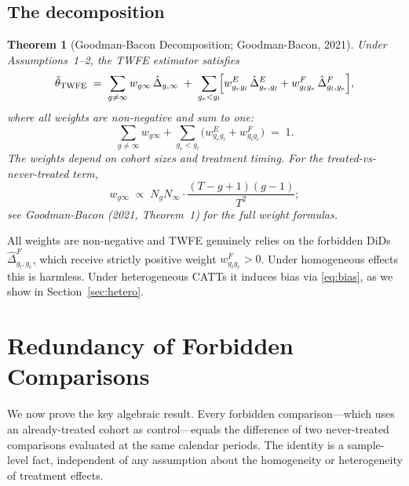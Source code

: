 \documentclass[12pt,letterpaper]{article}
\newtheorem{theorem}{Theorem}[section]
\theoremstyle{remark}
\theoremstyle{definition}
\newcommand{\TWFE}{\hat{\theta}_{\mathrm{TWFE}}}
\newcommand{\hDelta}{\hat{\Delta}}
\begin{document}
\subsection*{The decomposition}

\begin{theorem}[Goodman-Bacon Decomposition; Goodman-Bacon, 2021]
  \label{thm:gb}
  Under Assumptions~1--2, the TWFE estimator satisfies
  \begin{equation}
    \TWFE
    \;=\;
    \sum_{g\neq\infty}w_{g\infty}\,\hDelta_{g,\infty}
    \;+\;
    \sum_{g_e<g_l}\!
      \Bigl[
        w_{g_e g_l}^{E}\,\hDelta_{g_e,g_l}^{E}
        +
        w_{g_l g_e}^{F}\,\hDelta_{g_l,g_e}^{F}
      \Bigr],
    \label{eq:gb}
  \end{equation}
  where all weights are non-negative and sum to one:
  \[
    \sum_{g\neq\infty}w_{g\infty}
    +\sum_{g_e<g_l}\!\bigl(w_{g_e g_l}^{E}+w_{g_l g_e}^{F}\bigr)
    \;=\;1.
  \]
  The weights depend on cohort sizes and treatment timing. For the
  treated-vs-never-treated term,
  \[
    w_{g\infty}
    \;\propto\;
    N_g N_\infty \cdot
    \frac{(T-g+1)(g-1)}{T^2};
  \]
  see Goodman-Bacon (2021, Theorem~1) for the full weight formulas.
\end{theorem}

\noindent
All weights are non-negative and TWFE genuinely relies on the forbidden DiDs
$\hDelta_{g_l,g_e}^F$, which receive strictly positive weight $w_{g_l g_e}^F>0$.
Under homogeneous effects this is harmless. Under heterogeneous CATTs it
induces bias via \eqref{eq:bias}, as we show in Section~\ref{sec:hetero}.

\section{Redundancy of Forbidden Comparisons}
\label{sec:redundancy}

We now prove the key algebraic result. Every forbidden comparison---which uses
an already-treated cohort as control---equals the difference of two
never-treated comparisons evaluated at the same calendar periods. The identity
is a sample-level fact, independent of any assumption about the homogeneity or
heterogeneity of treatment effects.
\end{document}
